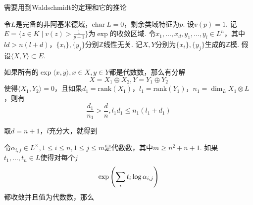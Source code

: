 需要用到Waldschmidt的定理和它的推论
\begin{cthm}
    令$L$是完备的非阿基米德域，$\mathrm{char}\ L = 0$，剩余类域特征为$p$. 设$v(p) = 1$. 记$E=\{z\in K\mid v(z) > \frac{1}{p-1}\}$为$\exp$的收敛区域. 令$x_1,\ldots,x_d,y_1,\ldots,y_l\in L^n$，其中$ld>n(l+d)$，$\{x_i\}, \{y_j\}$分别$\mathbb{Z}$线性无关. 记$X,Y$分别为$\{x_i\}, \{y_j\}$生成的$\mathbb{Z}$模. 假设$\langle X, Y\rangle \subset E$.

    如果所有的$\exp \langle x, y\rangle, x\in X, y\in Y$都是代数数，那么有分解
    \begin{equation}
        X = X_1\oplus X_2, Y=Y_1\oplus Y_2
    \end{equation}
    使得$\langle X_1, Y_2\rangle = 0$，且如果$d_1 = \mathrm{rank}(X_1)$，$l_1 = \mathrm{rank}(Y_1)$，$n_1 = \dim_L X_1\otimes L$，则有
    \begin{equation}
        \frac{d_1}{n_1} > \frac{d}{n}, l_1d_1\leq n_1(l_1+d_1)
    \end{equation}
\end{cthm}

取$d=n+1$，$l$充分大，就得到
\begin{ccor}
    令$\alpha_{i,j} \in L^{\times}, 1\leq i\leq n, 1\leq j\leq m$是代数数，其中$m\geq n^2+n+1$.
    如果$t_1,\ldots,t_n\in L$使得对每个$j$
    \begin{equation}
        \exp\left(\sum_i t_i\log \alpha_{i, j}\right)
    \end{equation}
    都收敛并且值为代数数，那么
    
\end{ccor}

